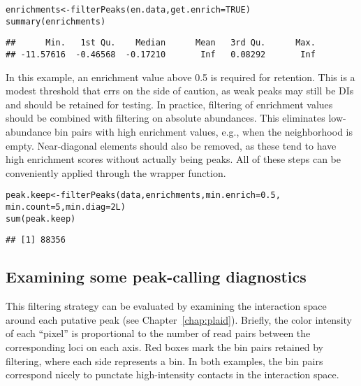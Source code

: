 \documentclass{report}\usepackage[]{graphicx}\usepackage[usenames,dvipsnames]{color}
\newcommand{\hlnum}[1]{\textcolor[rgb]{0.816,0.125,0.439}{#1}}%
\newcommand{\hlstd}[1]{\textcolor[rgb]{0.251,0.251,0.251}{#1}}%
\newcommand{\hlkwb}[1]{\textcolor[rgb]{0,0,0}{#1}}%
\newcommand{\hlkwc}[1]{\textcolor[rgb]{0.251,0.251,0.251}{#1}}%
\newcommand{\hlkwd}[1]{\textcolor[rgb]{0.878,0.439,0.125}{#1}}%
\newenvironment{knitrout}{}{} %
\begin{document}
\begin{knitrout}
\color{fgcolor}\begin{kframe}
\begin{alltt}
\hlstd{enrichments} \hlkwb{<-} \hlkwd{filterPeaks}\hlstd{(en.data,} \hlkwc{get.enrich}\hlstd{=}\hlnum{TRUE}\hlstd{)}
\hlkwd{summary}\hlstd{(enrichments)}
\end{alltt}
\begin{verbatim}
##      Min.   1st Qu.    Median      Mean   3rd Qu.      Max. 
## -11.57616  -0.46568  -0.17210       Inf   0.08292       Inf
\end{verbatim}
\end{kframe}
\end{knitrout}

In this example, an enrichment value above 0.5 is required for retention.
This is a modest threshold that errs on the side of caution, as weak peaks may still be DIs and should be retained for testing.
In practice, filtering of enrichment values should be combined with filtering on absolute abundances.
This eliminates low-abundance bin pairs with high enrichment values, e.g., when the neighborhood is empty.
Near-diagonal elements should also be removed, as these tend to have high enrichment scores without actually being peaks.
All of these steps can be conveniently applied through the  wrapper function.

\begin{knitrout}
\color{fgcolor}\begin{kframe}
\begin{alltt}
\hlstd{peak.keep} \hlkwb{<-} \hlkwd{filterPeaks}\hlstd{(data, enrichments,} \hlkwc{min.enrich}\hlstd{=}\hlnum{0.5}\hlstd{,}
                         \hlkwc{min.count}\hlstd{=}\hlnum{5}\hlstd{,} \hlkwc{min.diag}\hlstd{=}\hlnum{2L}\hlstd{)}
\hlkwd{sum}\hlstd{(peak.keep)}
\end{alltt}
\begin{verbatim}
## [1] 88356
\end{verbatim}
\end{kframe}
\end{knitrout}

\subsection{Examining some peak-calling diagnostics}
This filtering strategy can be evaluated by examining the interaction space around each putative peak (see Chapter~\ref{chap:plaid}).
Briefly, the color intensity of each ``pixel'' is proportional to the number of read pairs between the corresponding loci on each axis.
Red boxes mark the bin pairs retained by filtering, where each side represents a bin.
In both examples, the bin pairs correspond nicely to punctate high-intensity contacts in the interaction space.
\end{document}
